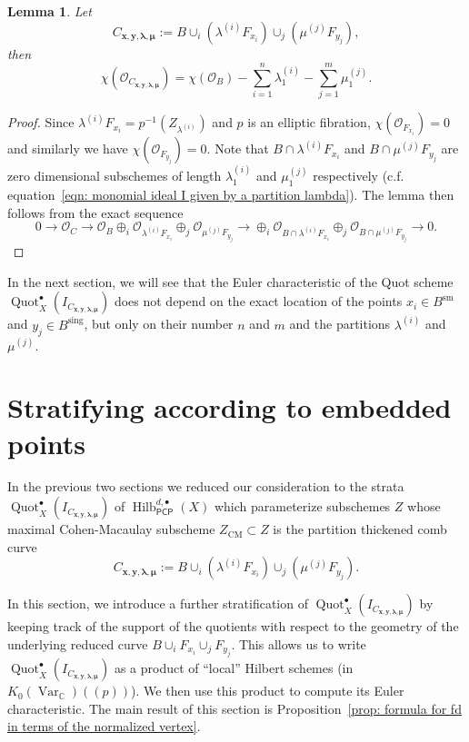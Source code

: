 \documentclass[12pt]{amsart}
\newtheorem{lemma}[theorem]{Lemma}
\theoremstyle{definition}
\newcommand{\CC} {\mathbb{C}}          %
\renewcommand{\O}{\mathcal{O}}
\newcommand{\Hilb}{\operatorname{Hilb}}
\newcommand{\Quot}{\operatorname{Quot}}
\newcommand{\CM}{\operatorname{CM}}
\newcommand{\Var}{\operatorname{Var}}
\newcommand{\sm}{\operatorname{sm}}
\newcommand{\sing}{\operatorname{sing}}
\newcommand{\boldx}{\boldsymbol{x}}
\newcommand{\boldy}{\boldsymbol{y}}
\newcommand{\boldlambda}{\boldsymbol{\lambda }}
\newcommand{\boldmu}{\boldsymbol{\mu }}
\newcommand{\PCP}{\mathsf{PCP}}
\newcommand{\presectionspace}{\vspace{0.2cm}} %
\begin{document}
\begin{lemma}\label{lem: chi(C)=chi(B) -sum lamba1 - sum mu1}
Let 
\[
C_{\boldx, \boldy, \boldlambda, \boldmu}:=B\cup_{i}\left(\lambda^{(i)}F_{x_{i}} \right)\cup_{j}\left(\mu^{(j)}F_{y_{j}} \right),
\]
then
\[
\chi (\O_{C_{\boldx, \boldy, \boldlambda, \boldmu}}) = \chi (\O_{B}) -\sum_{i=1}^{n}\lambda^{(i)}_{1}
-\sum_{j=1}^{m}\mu^{(j)}_{1}. 
\]
\end{lemma}
\begin{proof}
Since $\lambda^{(i)}F_{x_{i}}=p^{-1}(Z_{\lambda^{(i)}})$ and $p$ is an
elliptic fibration, $\chi (\O_{F_{x_{i}}})=0$ and similarly we have
$\chi (\O_{F_{y_{j}}})=0$. Note that $B\cap \lambda^{(i)}F_{x_{i}}$
and $B\cap \mu^{(j)}F_{y_{j}}$ are zero dimensional subschemes of
length $\lambda^{(i)}_{1}$ and $\mu^{(j)}_{1} $ respectively
(c.f. equation~\eqref{eqn: monomial ideal I given by a partition
lambda}). The lemma then follows from the exact sequence
\[
0\to \O_{C} \to
\O_{B}\oplus_{i}\O_{\lambda^{(i)}F_{x_{i}}}\oplus_{j}\O_{\mu^{(j)}F_{y_{j}}}
\to \oplus_{i}\O_{B\cap \lambda^{(i)}F_{x_{i}}}\oplus_{j}\O_{B\cap \mu^{(j)}F_{y_{j}}}  \to 0.
\]
\end{proof}




In the next section, we will see that the Euler characteristic of the Quot scheme
$\Quot_X^{\bullet}(I_{C_{\boldx, \boldy, \boldlambda, \boldmu}})$ does not depend on the exact location of
the points $x_i \in B^{\sm}$ and $y_j \in B^{\sing}$, but only on
their number $n$ and $m$ and the partitions $\lambda^{(i)}$ and
$\mu^{(j)}$.



\presectionspace
\section{Stratifying according to embedded points} \label{sec: restriction
to formal nghds}

In the previous two sections we reduced our consideration to the
strata $\Quot_X^{\bullet}(I_{C_{\boldx, \boldy, \boldlambda, \boldmu}})$
of $ \Hilb^{d,\bullet}_{\PCP }(X)$ which parameterize subschemes $Z$ whose maximal
Cohen-Macaulay subscheme $Z_{\CM} \subset Z$ is the partition
thickened comb curve 
\[
C_{\boldx, \boldy, \boldlambda, \boldmu}:=B\cup_{i}(\lambda^{(i)}F_{x_{i}})\cup_{j}(\mu^{(j)}F_{y_{j}}).
\]

In this section, we introduce a further stratification of $\Quot_X^{\bullet}(I_{C_{\boldx, \boldy, \boldlambda, \boldmu}})$ 
by keeping track of the support of the quotients with respect to the geometry of the underlying reduced curve
$B\cup_{i} F_{x_{i}} \cup_{j} F_{y_{j}}$. This allows us to write $\Quot_X^{\bullet}(I_{C_{\boldx, \boldy, \boldlambda, \boldmu}})$ as a product 
of ``local'' Hilbert schemes (in $K_{0}(\Var_{\CC})(\!(p)\!)$). We then
use this product to compute its Euler characteristic. The main result of this section is
Proposition~\ref{prop: formula for fd in terms of the normalized
vertex}.
\end{document}
